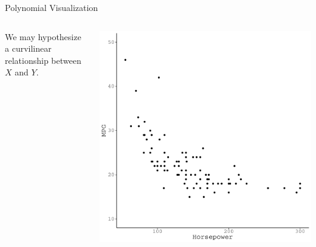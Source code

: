 \documentclass{beamer}\usepackage[]{graphicx}\usepackage[]{color}
\makeatletter
\def\maxwidth{ %
  \ifdim\Gin@nat@width>\linewidth
    \linewidth
  \else
    \Gin@nat@width
  \fi
}
\newenvironment{knitrout}{}{} %
\makeatother
\begin{document}
\begin{frame}{Polynomial Visualization}
  
  \begin{columns}
    \begin{column}{0.5\textwidth}
      We may hypothesize a curvilinear relationship between $X$ and $Y$.
    \end{column}
    
    \begin{column}{0.5\textwidth}
      
\begin{knitrout}\footnotesize
{}\color{fgcolor}

{\centering \includegraphics[width=\maxwidth]{figure/unnamed-chunk-26-1} 

}



\end{knitrout}

\end{column}
\end{columns}

\end{frame}

\end{document}
